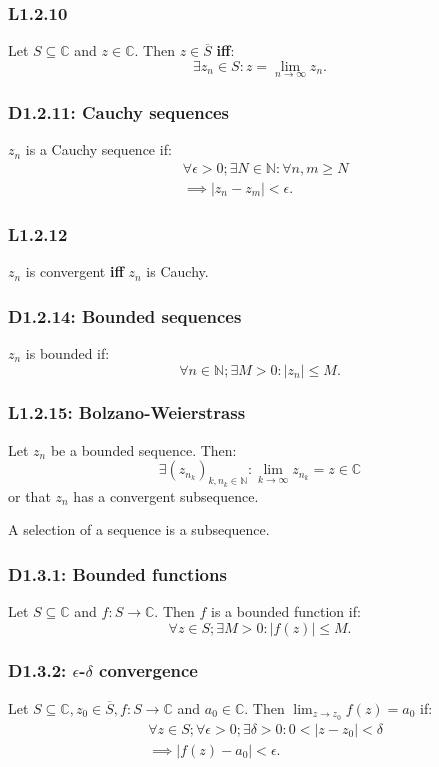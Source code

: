\documentclass{article}
\begin{document}
\begin{multicols*}{3}
\subsubsection*{L1.2.10}
Let $S\subseteq\mathbb{C}$ and $z\in\mathbb{C}$.
Then $z\in\overline{S}$ \textbf{if{}f}:
$$\exists z_n\in S: z=\lim_{n\rightarrow\infty}z_n.$$

\subsubsection*{D1.2.11: Cauchy sequences}
$z_n$ is a Cauchy sequence if:
\begin{align*}
    &\forall\epsilon>0;\exists N\in\mathbb{N}:
    \forall n,m\geq N \\
    &\implies |z_n-z_m|<\epsilon.
\end{align*}

\subsubsection*{L1.2.12}
$z_n$ is convergent \textbf{if{}f} $z_n$ is Cauchy.

\subsubsection*{D1.2.14: Bounded sequences}
$z_n$ is bounded if:
$$\forall n\in\mathbb{N};\exists M>0:|z_n|\leq M.$$

\subsubsection*{L1.2.15: Bolzano-Weierstrass}
Let $z_n$ be a bounded sequence. Then:
$$\exists (z_{n_k})_{k,n_k\in\mathbb{N}}:
\lim_{k\rightarrow\infty}z_{n_k}=z\in\mathbb{C}$$
or that $z_n$ has a convergent subsequence.

A selection of a sequence is a subsequence.

\subsubsection*{D1.3.1: Bounded functions}
Let $S\subseteq\mathbb{C}$ and $f:S\rightarrow\mathbb{C}$.
Then $f$ is a bounded function if:
$$\forall z\in S;\exists M>0:|f(z)|\leq M.$$

\subsubsection*{D1.3.2: $\epsilon$-$\delta$ convergence}
Let $S\subseteq\mathbb{C}, z_0\in\overline{S},f:S\rightarrow\mathbb{C}$
and $a_0\in\mathbb{C}$.
Then $\displaystyle\lim_{z\rightarrow z_0}f(z)=a_0$ if:
\begin{align*}
    &\forall z\in S;\forall\epsilon>0;\exists\delta>0:
    0<|z-z_0|<\delta \\
    &\implies|f(z)-a_0|<\epsilon.
\end{align*}


\end{multicols*}
\end{document}
